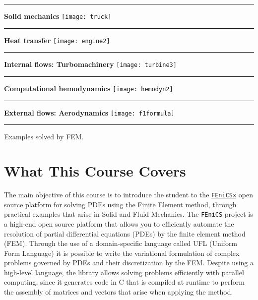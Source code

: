 \begin{marginfigure}[-4.0cm]
	\hrule
	\vspace{0.1cm}
	\flushleft \textbf{\scriptsize Solid mechanics}
	\texttt{[image: truck]}
	\vspace{0.1cm}       
	\hrule
	\vspace{0.1cm}
	\textbf{\scriptsize Heat transfer}
	\texttt{[image: engine2]}
	\vspace{0.1cm}       
	\hrule
	\vspace{0.1cm}
	\textbf{\scriptsize Internal flows: Turbomachinery}
	\texttt{[image: turbine3]}
	\vspace{0.1cm}
	\hrule
	\vspace{0.1cm}
	\textbf{\scriptsize Computational hemodynamics}
	\texttt{[image: hemodyn2]}
	\vspace{0.1cm}~\\
	\hrule
	\vspace{0.1cm}
	\textbf{\scriptsize External flows: Aerodynamics}
	\texttt{[image: f1formula]}
	\vspace{0.1cm} 
	\hrule
	\caption[]{Examples solved by FEM.}
\end{marginfigure}

\section{What This Course Covers}

The main objective of this course is to introduce the student to the \href{https://fenicsproject.org/}{\texttt{FEniCSx}} open source platform for solving PDEs using the Finite Element method, through practical examples that arise in Solid and Fluid Mechanics.
The \texttt{FEniCS} project is a high-end open source platform that allows you to efficiently automate the resolution of partial differential equations (PDEs) by the finite element method (FEM). Through the use of a domain-specific language called UFL (Uniform Form Language) it is possible to write the variational formulation of complex problems governed by PDEs and their discretization by the FEM. Despite using a high-level language, the library allows solving problems efficiently with parallel computing, since it generates code in C that is compiled at runtime to perform the assembly of matrices and vectors that arise when applying the method. 

